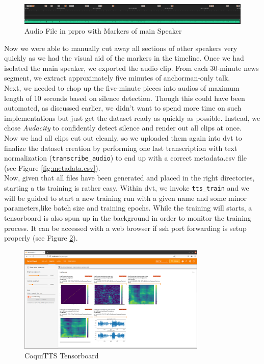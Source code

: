 \documentclass[
  a4paper,  %
  twoside,  %
  bibliography=totoc,
  headsepline,
  cleardoublepage=empty,
  parskip=half,
  draft=false
]{scrbook}
\begin{document}
\begin{figure}[h]
  \centering
  \includegraphics[width=1\textwidth]{./graphics/tts/premier with markers.png}
  \caption{Audio File in \gls{prpro} with Markers of main Speaker}
  \label{fig:premier-markers}
\end{figure}

Now we were able to manually cut away all sections of other speakers very quickly as we had the visual aid of the markers in the timeline. Once we had isolated the main speaker, we exported the audio clip. From each 30-minute news segment, we extract approximately five minutes of anchorman-only talk.\\
Next, we needed to chop up the five-minute pieces into audios of  maximum length of 10 seconds based on silence detection. Though this could have been automated, as discussed earlier, we didn't want to spend more time on such implementations but just get the dataset ready as quickly as possible. Instead, we chose \textit{Audacity} to confidently detect silence and render out all clips at once. \\
Now we had all clips cut out cleanly, so we uploaded them again into \gls{dvt} to finalize the dataset creation by performing one last transcription with text normalization (\verb|transcribe_audio|) to end up with a correct metadata.csv file (see Figure \ref{fig:metadata.csv}). \\
Now, given that all files have been generated and placed in the right directories, starting a \gls{tts} training is rather easy. Within \gls{dvt}, we invoke \verb|tts_train| and we will be guided to start a new training run with a given name and some minor parameters,like batch size and training epochs. While the training will starts, a tensorboard is also spun up in the background in order to monitor the training process. It can be accessed with a web browser if ssh port forwarding is setup properly (see Figure \ref{fig:tensorboard}).

\begin{figure}[h]
  \centering
  \includegraphics[width=0.8\textwidth]{./graphics/tts/tensorboard.png}
  \caption{CoquiTTS Tensorboard \cite{TensorboardPngMbarnig2022}}
  \label{fig:tensorboard}
\end{figure}
\end{document}

